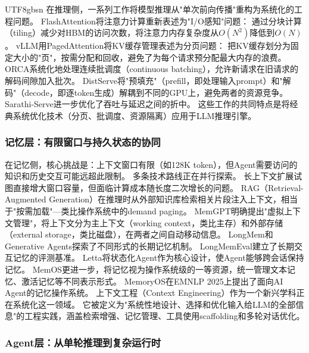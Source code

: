 \documentclass[11pt,a4paper]{article}
\begin{document}
\begin{CJK*}{UTF8}{gbsn}
在推理侧，一系列工作将模型推理从"单次前向传播"重构为系统化的工程问题。
FlashAttention\cite{dao2022flashattention,dao2023flashattention2}将注意力计算重新表述为"I/O感知"问题：
通过分块计算（tiling）减少对HBM的访问次数，将注意力内存复杂度从$O(N^2)$降低到$O(N)$。
vLLM用PagedAttention\cite{kwon2023pagedattention}将KV缓存管理表述为分页问题：
把KV缓存划分为固定大小的"页"，按需分配和回收，避免了为每个请求预分配最大内存的浪费。
ORCA\cite{orca2022}系统化地处理连续批调度（continuous batching），允许新请求在旧请求的解码间隙加入批次。
DistServe\cite{zhong2024distserve}将"预填充"（prefill，即处理输入prompt）和"解码"（decode，即逐token生成）解耦到不同的GPU上，避免两者的资源竞争。
Sarathi-Serve\cite{agrawal2024sarathi}进一步优化了吞吐与延迟之间的折中。
这些工作的共同特点是将经典系统优化技术（分页、批调度、资源隔离）应用于LLM推理引擎。

\subsubsection{记忆层：有限窗口与持久状态的协同}

在记忆侧，核心挑战是：上下文窗口有限（如128K token），但Agent需要访问的知识和历史交互可能远超此限制。
多条技术路线正在并行探索。
长上下文扩展\cite{gemini2024,yarn2024}试图直接增大窗口容量，但面临计算成本随长度二次增长的问题。
RAG（Retrieval-Augmented Generation）\cite{lewis2020rag}在推理时从外部知识库检索相关片段注入上下文，相当于"按需加载"---类比操作系统中的demand paging。
MemGPT\cite{memgpt2023}明确提出"虚拟上下文管理"，将上下文分为主上下文（working context，类比主存）和外部存储（external storage，类比磁盘），在两者之间自动移动信息。
LongMem\cite{longmem2023}和Generative Agents\cite{park2023generativeagents}探索了不同形式的长期记忆机制。
LongMemEval\cite{longmemeval2024}建立了长期交互记忆的评测基准。
Letta\cite{letta_stateful_2026}将状态化Agent作为核心设计，使Agent能够跨会话保持记忆。
MemOS\cite{memos2025}更进一步，将记忆视为操作系统级的一等资源，统一管理文本记忆、激活记忆等不同表示形式。
MemoryOS\cite{memoryos2025}在EMNLP 2025上提出了面向AI Agent的记忆操作系统。
上下文工程（Context Engineering）\cite{contextengineer_survey2025}作为一个新兴学科正在系统化这一领域。
它被定义为"系统性地设计、选择和优化输入给LLM的全部信息"的工程实践，涵盖检索增强、记忆管理、工具使用scaffolding和多轮对话优化。

\subsubsection{Agent层：从单轮推理到复杂运行时}


\end{CJK*}
\end{document}
